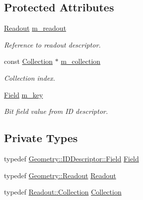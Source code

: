 \subsection*{Protected Attributes}
\begin{DoxyCompactItemize}
\item 
\hyperlink{class_d_d4hep_1_1_geometry_1_1_readout}{Readout} \hyperlink{class_d_d4hep_1_1_simulation_1_1_geant4_readout_volume_filter_a37eef102fa9c5ac1618be624129b61de}{m\_\-readout}
\begin{DoxyCompactList}\small\item\em Reference to readout descriptor. \item\end{DoxyCompactList}\item 
const \hyperlink{class_d_d4hep_1_1_geometry_1_1_hit_collection}{Collection} $\ast$ \hyperlink{class_d_d4hep_1_1_simulation_1_1_geant4_readout_volume_filter_ab38d8bb4c3c84b5e71af194dc2e9c060}{m\_\-collection}
\begin{DoxyCompactList}\small\item\em Collection index. \item\end{DoxyCompactList}\item 
\hyperlink{class_d_d4hep_1_1_simulation_1_1_geant4_readout_volume_filter_a6b5e464fd34617d118c15b917c9094fa}{Field} \hyperlink{class_d_d4hep_1_1_simulation_1_1_geant4_readout_volume_filter_a56f36107494374152415b45a635d4030}{m\_\-key}
\begin{DoxyCompactList}\small\item\em Bit field value from ID descriptor. \item\end{DoxyCompactList}\end{DoxyCompactItemize}
\subsection*{Private Types}
\begin{DoxyCompactItemize}
\item 
typedef \hyperlink{class_d_d4hep_1_1_geometry_1_1_i_d_descriptor_ac06f5915e74f8a8f2ff73e9a322556e4}{Geometry::IDDescriptor::Field} \hyperlink{class_d_d4hep_1_1_simulation_1_1_geant4_readout_volume_filter_a6b5e464fd34617d118c15b917c9094fa}{Field}
\item 
typedef \hyperlink{class_d_d4hep_1_1_geometry_1_1_readout}{Geometry::Readout} \hyperlink{class_d_d4hep_1_1_simulation_1_1_geant4_readout_volume_filter_a30e6a3445a33de61e3c648149e285c46}{Readout}
\item 
typedef \hyperlink{class_d_d4hep_1_1_geometry_1_1_hit_collection}{Readout::Collection} \hyperlink{class_d_d4hep_1_1_simulation_1_1_geant4_readout_volume_filter_a8a5e97e2736eb07d0d98f3300ca4b61d}{Collection}
\end{DoxyCompactItemize}


